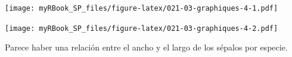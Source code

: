 \documentclass[
]{book}
\newenvironment{Shaded}{\begin{snugshade}}{\end{snugshade}}
\newcommand{\CommentTok}[1]{\textcolor[rgb]{0.56,0.35,0.01}{\textit{#1}}}
\newcommand{\DataTypeTok}[1]{\textcolor[rgb]{0.13,0.29,0.53}{#1}}
\newcommand{\DecValTok}[1]{\textcolor[rgb]{0.00,0.00,0.81}{#1}}
\newcommand{\KeywordTok}[1]{\textcolor[rgb]{0.13,0.29,0.53}{\textbf{#1}}}
\newcommand{\NormalTok}[1]{#1}
\newcommand{\OperatorTok}[1]{\textcolor[rgb]{0.81,0.36,0.00}{\textbf{#1}}}
\newcommand{\StringTok}[1]{\textcolor[rgb]{0.31,0.60,0.02}{#1}}
\begin{document}
\texttt{[image: myRBook\_SP\_files/figure-latex/021-03-graphiques-4-1.pdf]}

\begin{Shaded}
\end{Shaded}

\texttt{[image: myRBook\_SP\_files/figure-latex/021-03-graphiques-4-2.pdf]}

Parece haber una relación entre el ancho y el largo de los sépalos por especie.
\end{document}

